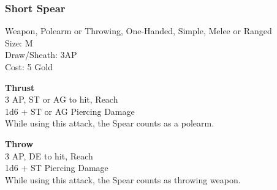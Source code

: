 \subsubsection{Short Spear}\label{weapon:shortSpear}
Weapon, Polearm or Throwing, One-Handed, Simple, Melee or Ranged\\
Size: M\\
Draw/Sheath: 3AP\\
Cost: 5 Gold

\textbf{Thrust}\\
3 AP, ST or AG to hit,  Reach\\
1d6 + \texttimes ST or AG Piercing Damage\\
While using this attack, the Spear counts as a polearm.

\textbf{Throw}\\
3 AP, DE to hit,  Reach\\
1d6 + \texttimes ST Piercing Damage\\
While using this attack, the Spear counts as throwing weapon.

